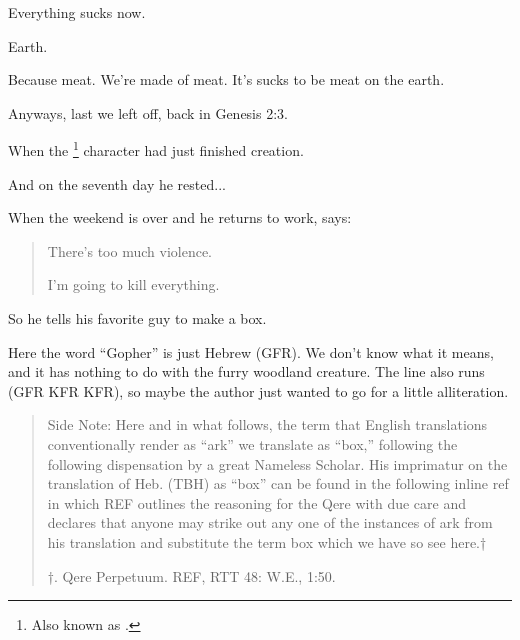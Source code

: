 {
}
{
}
{
	Everything sucks now.
}

{
}
{
}
{
	 Earth.
	
	 Because meat. We're made of meat. It's sucks to be meat on the earth.
}

{
}
{
}
{
	Anyways, last we left off, back in Genesis 2:3.

	When the \footnote{Also known as .} character had just finished creation.

	And on the seventh day he rested...

	When the weekend is over and he returns to work,  says:

	\begin{quote}
	There's too much violence.

	I'm going to kill everything.
	\end{quote}
}

{
}
{
}
{
	So he tells his favorite guy to make a box.

	Here the word ``Gopher'' is just Hebrew  (GFR).
	We don't know what it means, and it has nothing to do with
	the furry woodland creature. The line also runs
	 (GFR KFR KFR), so maybe the author just wanted to go for
	a little alliteration.

	\begin{quote}
	\scriptsize
	Side Note: Here and in what follows, the term that English translations
	conventionally render as ``ark'' we translate as ``box,'' following the
	following dispensation by a great Nameless Scholar. His imprimatur on
	the translation of Heb.  (TBH) as ``box'' can be found in the
	following inline ref in which REF outlines the reasoning for the Qere
	with due care and declares that anyone may strike out any one of the
	instances of ark from his translation and substitute the term box
	which we have so see here.†

	†. Qere Perpetuum. REF, RTT 48: W.E., 1:50.%
	\end{quote}
}

